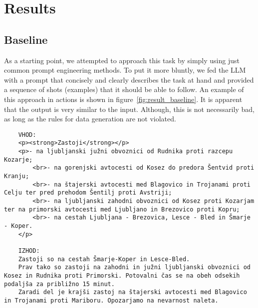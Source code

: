 \documentclass[fleqn,moreauthors,10pt]{ds_report}
\begin{document}


\section*{Results}

\subsection*{Baseline}

As a starting point, we attempted to approach this task by simply using just common prompt engineering methods.
To put it more bluntly, we fed the LLM with a prompt that concisely and clearly describes the task at hand and provided a sequence of shots (examples) that it should be able to follow.
An example of this approach in actions is shown in figure~\ref{fig:result_baseline}.
It is apparent that the output is very similar to the input.
Although, this is not necessarily bad, as long as the rules for data generation are not violated.

\begin{figure*}[t] %
    \begin{verbatim}
    VHOD:
    <p><strong>Zastoji</strong></p>
    <p>- na ljubljanski južni obvoznici od Rudnika proti razcepu Kozarje;
        <br>- na gorenjski avtocesti od Kosez do predora Šentvid proti Kranju;
        <br>- na štajerski avtocesti med Blagovico in Trojanami proti Celju ter pred prehodom Šentilj proti Avstriji;
        <br>- na ljubljanski zahodni obvoznici od Kosez proti Kozarjam ter na primorski avtocesti med Ljubljano in Brezovico proti Kopru;
        <br>- na cestah Ljubljana - Brezovica, Lesce - Bled in Šmarje - Koper.
    </p>

    IZHOD:
    Zastoji so na cestah Šmarje-Koper in Lesce-Bled.
    Prav tako so zastoji na zahodni in južni ljubljanski obvoznici od Kosez in Rudnika proti Primorski. Potovalni čas se na obeh odsekih podaljša za približno 15 minut.
    Zaradi del je krajši zastoj na štajerski avtocesti med Blagovico in Trojanami proti Mariboru. Opozarjamo na nevarnost naleta.
    \end{verbatim}
    \caption{An example of LLM output generation for given input data using only prompt engineering methods.}
    \label{fig:result_baseline}
\end{figure*}
\end{document}
